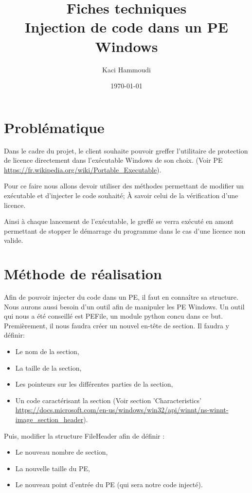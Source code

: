 \documentclass{article}
\title{
    \Huge
    Fiches techniques\\
    Injection de code dans un PE Windows
}
\author{\huge Kaci Hammoudi}
\date{\huge \today}
\begin{document}
\maketitle
\newpage

\section{Problématique}

Dans le cadre du projet, le client souhaite pouvoir greffer l'utilitaire de protection de licence directement dans l'exécutable Windows de son choix. 
(Voir PE \url{https://fr.wikipedia.org/wiki/Portable_Executable}).

Pour ce faire nous allons devoir utiliser des méthodes permettant de modifier un exécutable
et d'injecter le code souhaité; À savoir celui de la vérification d'une licence.

Ainsi à chaque lancement de l'exécutable, le greffé se verra exécuté en amont permettant 
de stopper le démarrage du programme dans le cas d'une licence non valide.

\section{Méthode de réalisation}

Afin de pouvoir injecter du code dans un PE, il faut en connaître sa structure. 
Nous aurons aussi besoin d'un outil afin de manipuler les PE Windows.
Un outil qui nous a été conseillé est PEFile, un module python concu dans ce but.\\

Premièrement, il nous faudra créer un nouvel en-tête de section.
Il faudra y définir: 
\begin{itemize}
    \item Le nom de la section,
    \item La taille de la section,
    \item Les pointeurs sur les différentes parties de la section,
    \item Un code caractérisant la section (Voir section 'Characteristics' \url{https://docs.microsoft.com/en-us/windows/win32/api/winnt/ns-winnt-image_section_header}).
\end{itemize}

Puis, modifier la structure FileHeader afin de définir :
\begin{itemize}
    \item Le nouveau nombre de section,
    \item La nouvelle taille du PE,
    \item Le nouveau point d'entrée du PE (qui sera notre code injecté).
\end{itemize}
\end{document}
